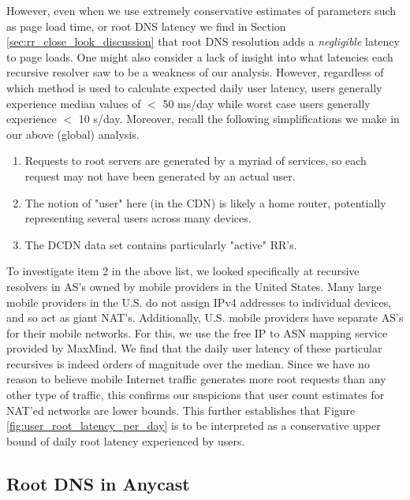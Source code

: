 \documentclass[sigconf,nonacm,10pt]{acmart}
\begin{document}
However, even when we use extremely conservative estimates of parameters
such as page load time, or root DNS latency we find in Section
\ref{sec:rr_close_look_discussion} that root DNS resolution adds a
\textit{negligible} latency to page loads. \break
One might also consider a lack of insight into what latencies each
recursive resolver saw to be a weakness of our analysis. However,
regardless of which method is used to calculate expected daily user
latency, users generally experience median values of \(<\) 50 ms/day
while worst case users generally experience \(<\) 10 s/day. Moreover,
recall the following simplifications we make in our above (global)
analysis.

\begin{enumerate}
        \item Requests to root servers are generated by a myriad of services, so each request may not have been generated by an actual user.
        \item The notion of "user" here (in the CDN) is likely a home router, potentially representing several users across many devices.
        \item The DCDN data set contains particularly "active" RR's.
\end{enumerate}

To investigate item 2 in the above list, we looked specifically at
recursive resolvers in AS's owned by mobile providers in the United
States. Many large mobile providers in the U.S. do not assign IPv4
addresses to individual devices, and so act as giant NAT's.
Additionally, U.S. mobile providers have separate AS's for their mobile
networks. For this, we use the free IP to ASN mapping service provided
by MaxMind. We find that the daily user latency of these particular
recursives is indeed orders of magnitude over the median. Since we have
no reason to believe mobile Internet traffic generates more root
requests than any other type of traffic, this confirms our suspicions
that user count estimates for NAT'ed networks are lower bounds. \break
This further establishes that Figure \ref{fig:user_root_latency_per_day}
is to be interpreted as a conservative upper bound of daily root latency
experienced by users.

\subsection{Root DNS in Anycast}\label{root-dns-in-anycast}
\end{document}
